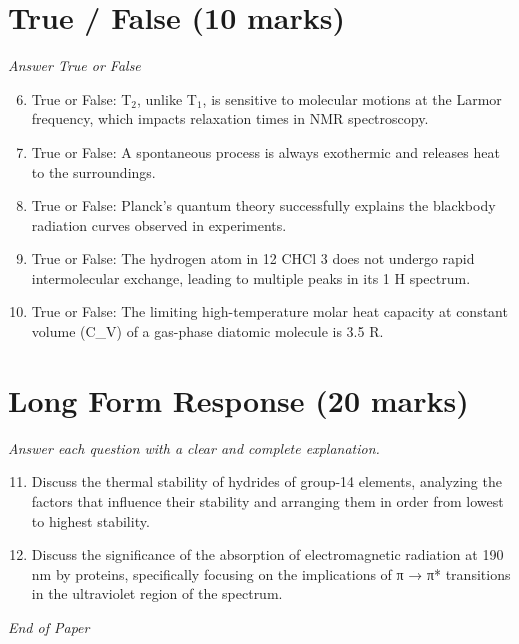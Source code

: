 \documentclass[12pt]{article}
\begin{document}
\section*{True / False (10 marks)}
\textit{Answer True or False}
\begin{enumerate}[label=\arabic*.]
\setcounter{enumi}{5}
\item True or False: T$_{2}$, unlike T$_{1}$, is sensitive to molecular motions at the Larmor frequency, which impacts relaxation times in NMR spectroscopy.
\item True or False: A spontaneous process is always exothermic and releases heat to the surroundings.
\item True or False: Planck's quantum theory successfully explains the blackbody radiation curves observed in experiments.
\item True or False: The hydrogen atom in 12 CHCl 3 does not undergo rapid intermolecular exchange, leading to multiple peaks in its 1 H spectrum.
\item True or False: The limiting high-temperature molar heat capacity at constant volume (C\_V) of a gas-phase diatomic molecule is 3.5 R.
\end{enumerate}

\section*{Long Form Response (20 marks)}
\textit{Answer each question with a clear and complete explanation.}
\begin{enumerate}[label=\arabic*.]
\setcounter{enumi}{10}
\item Discuss the thermal stability of hydrides of group-14 elements, analyzing the factors that influence their stability and arranging them in order from lowest to highest stability.
\item Discuss the significance of the absorption of electromagnetic radiation at 190 nm by proteins, specifically focusing on the implications of π → π* transitions in the ultraviolet region of the spectrum.
\end{enumerate}

\vfill
\noindent\textit{End of Paper}
\end{document}
